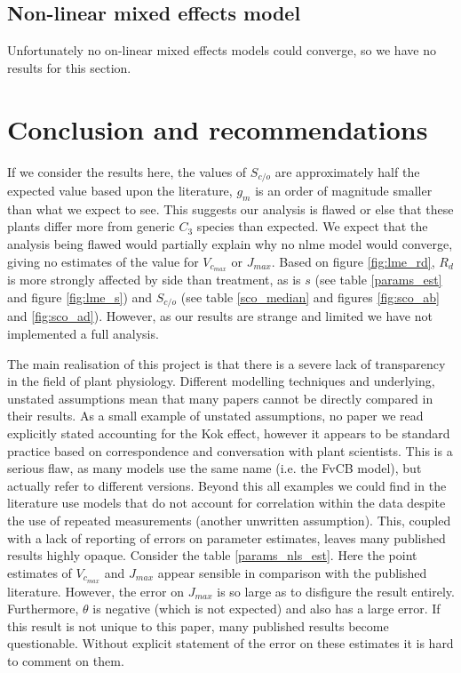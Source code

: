 \documentclass[11pt]{article} %
\begin{document}
\subsection{Non-linear mixed effects model}
Unfortunately no on-linear mixed effects models could converge, so we have no results for this section.

\section{Conclusion and recommendations}
If we consider the results here, the values of $S_{c/o}$ are approximately half the expected value based upon the literature, $g_m$ is an order of magnitude smaller than what we expect to see. This suggests our analysis is flawed or else that these plants differ more from generic $C_3$ species than expected. We expect that the analysis being flawed would partially explain why no nlme model would converge, giving no estimates of the value for $V_{c_{max}}$ or $J_{max}$. Based on figure \ref{fig:lme_rd}, $R_d$ is more strongly affected by side than treatment, as is $s$ (see table \ref{params_est} and figure \ref{fig:lme_s}) and $S_{c/o}$ (see table \ref{sco_median} and figures \ref{fig:sco_ab} and \ref{fig:sco_ad}). However, as our results are strange and limited we have not implemented a full analysis.

The main realisation of this project is that there is a severe lack of transparency in the field of plant physiology. Different modelling techniques and underlying, unstated assumptions mean that many papers cannot be directly compared in their results. As a small example of unstated assumptions, no paper we read explicitly stated accounting for the Kok effect, however it appears to be standard practice based on correspondence and conversation with plant scientists. This is a serious flaw, as many models use the same name (i.e. the FvCB model), but actually refer to different versions. Beyond this all examples we could find in the literature use models that do not account for correlation within the data despite the use of repeated measurements (another unwritten assumption). This, coupled with a lack of reporting of errors on parameter estimates, leaves many published results highly opaque. Consider the table \ref{params_nls_est}. Here the point estimates of $V_{c_{max}}$ and $J_{max}$ appear sensible in comparison with the published literature. However, the error on $J_{max}$ is so large as to disfigure the result entirely. Furthermore, $\theta$ is negative (which is not expected) and also has a large error. If this result is not unique to this paper, many published results become questionable. Without explicit statement of the error on these estimates it is hard to comment on them.
\end{document}
